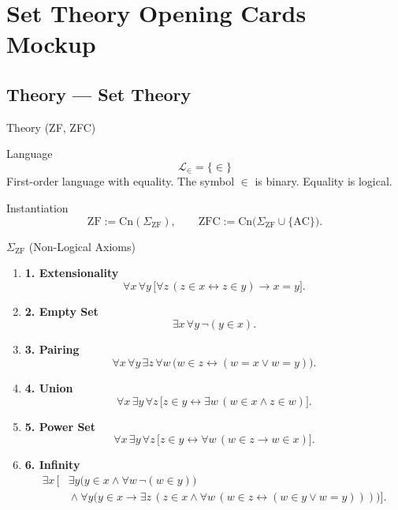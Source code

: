 \documentclass[12pt, a4paper]{report}
\begin{document}
\ExplSyntaxOff
\renewcommand{\familydefault}{\rmdefault}

\chapter*{Set Theory Opening Cards Mockup}

\section*{Theory --- Set Theory}

\begin{modelbox}{Theory (ZF, ZFC)}

\begin{modelcomponent}{Language}
\[
  \mathcal L_{\in}=\{\in\}
\]
First-order language with equality. The symbol \(\in\) is binary. Equality is
logical.
\end{modelcomponent}

\begin{modelcomponent}{Instantiation}
\[
  \mathrm{ZF}:=\mathrm{Cn}(\Sigma_{\mathrm{ZF}}),
  \qquad
  \mathrm{ZFC}:=\mathrm{Cn}\bigl(\Sigma_{\mathrm{ZF}}\cup\{\mathrm{AC}\}\bigr).
\]
\end{modelcomponent}

\begin{modelcomponent}{\(\Sigma_{\mathrm{ZF}}\) (Non-Logical Axioms)}
\begin{enumerate}[leftmargin=1.6em,itemsep=2pt]
  \item \textbf{1. Extensionality}
  \[
  \forall x\,\forall y\,
  \bigl[\forall z\,(z\in x\leftrightarrow z\in y)\to x=y\bigr].
  \]

  \item \textbf{2. Empty Set}
  \[
  \exists x\,\forall y\,\neg(y\in x).
  \]

  \item \textbf{3. Pairing}
  \[
  \forall x\,\forall y\,\exists z\,\forall w\,
  \bigl(w\in z\leftrightarrow (w=x\vee w=y)\bigr).
  \]

  \item \textbf{4. Union}
  \[
  \forall x\,\exists y\,\forall z\,
  \bigl[z\in y\leftrightarrow \exists w\,(w\in x\wedge z\in w)\bigr].
  \]

  \item \textbf{5. Power Set}
  \[
  \forall x\,\exists y\,\forall z\,
  \bigl[z\in y\leftrightarrow \forall w\,(w\in z\to w\in x)\bigr].
  \]

  \item \textbf{6. Infinity}
  \[
  \begin{aligned}
  \exists x\,\Big[&
    \exists y\bigl(y\in x\wedge \forall w\,\neg(w\in y)\bigr)\\
    &{}\wedge
    \forall y\bigl(y\in x\to
      \exists z\,(z\in x\wedge
        \forall w\,(w\in z\leftrightarrow (w\in y\vee w=y)))\bigr)
  \Big].
  \end{aligned}
  \]


\end{enumerate}
\end{modelcomponent}
\end{modelbox}
\end{document}
